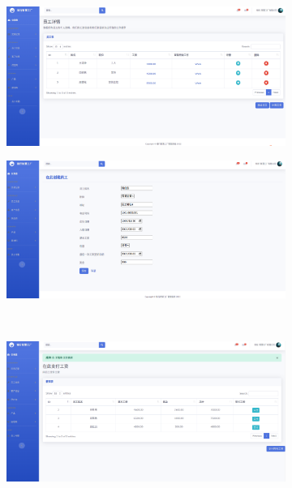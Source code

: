 \begin{figure}[H]
    \centering
    \begin{subfigure}{.45\textwidth}
        \centering
        \includegraphics[width=\textwidth]{figures/6viewallemployee.png}
    \end{subfigure}
    \qquad
    \begin{subfigure}{.45\textwidth}
        \centering
        \includegraphics[width=\textwidth]{figures/6addnewemployee.png}
    \end{subfigure}
    \\
    \begin{subfigure}{.45\textwidth}
        \centering
        \includegraphics[width=\textwidth]{figures/6paysalary.png}

\end{subfigure}
\end{figure}
